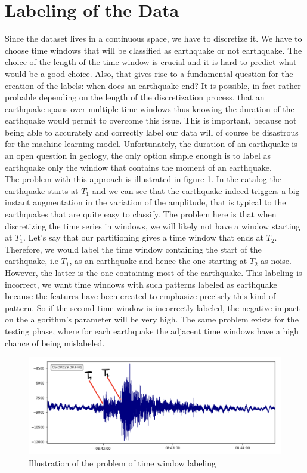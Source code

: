 \documentclass[10pt,conference,compsocconf]{IEEEtran}
\begin{document}
\section{Labeling of the Data}
\label{section:labeling}
Since the dataset lives in a continuous space, we have to discretize it. We have to choose time windows that will be classified as earthquake or not earthquake. The choice of the length of the time window is crucial and it is hard to predict what would be a good choice. Also, that gives rise to a fundamental question for the creation of the labels: when does an earthquake end? It is possible, in fact rather probable depending on the length of the discretization process, that an earthquake spans over multiple time windows thus knowing the duration of the earthquake would permit to overcome this issue. This is important, because not being able to accurately and correctly label our data will of course be disastrous for the machine learning model. Unfortunately, the duration of an earthquake is an open question in geology, the only option simple enough is to label as earthquake only the window that contains the moment of an earthquake.\\
The problem with this approach is illustrated in figure \ref{fig:problem-discretization}. In the catalog the earthquake starts at $T_1$ and we can see that the earthquake indeed triggers a big instant augmentation in the variation of the amplitude, that is typical to the earthquakes that are quite easy to classify. The problem here is that when discretizing the time series in windows, we will likely not have a window starting at $T_1$. Let's say that our partitioning gives a time window that ends at $T_2$. Therefore, we would label the time window containing the start of the earthquake, i.e $T_1$, as an earthquake and hence the one starting at $T_2$ as noise. However, the latter is the one containing most of the earthquake. This labeling is incorrect, we want time windows with such patterns labeled as earthquake because the features have been created to emphasize precisely this kind of pattern. So if the second time window is incorrectly labeled, the negative impact on the algorithm's parameter will be very high. The same problem exists for the testing phase, where for each earthquake the adjacent time windows have a high chance of being mislabeled.

\begin{figure}[h]
  \centering
	\includegraphics[width=\columnwidth]{problem-time-window-labeling.png}
  \caption{Illustration of the problem of time window labeling}
	\label{fig:problem-discretization}
\end{figure}
\end{document}
